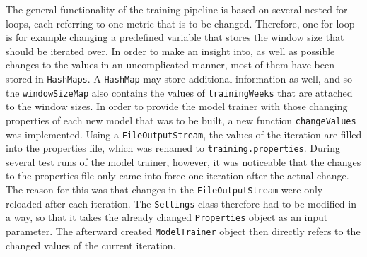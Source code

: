 The general functionality of the training pipeline is based on several nested for-loops, each referring to one metric that is to be changed. Therefore, one for-loop is for example changing a predefined variable that stores the window size that should be iterated over. In order to make an insight into, as well as possible changes to the values in an uncomplicated manner, most of them have been stored in \texttt{HashMaps}. A \texttt{HashMap} may store additional information as well, and so the \texttt{windowSizeMap} also contains the values of \texttt{trainingWeeks} that are attached to the window sizes. In order to provide the model trainer with those changing properties of each new model that was to be built, a new function \texttt{changeValues} was implemented. Using a \texttt{FileOutputStream}, the values of the iteration are filled into the properties file, which was renamed to \texttt{training.properties}. During several test runs of the model trainer, however, it was noticeable that the changes to the properties file only came into force one iteration after the actual change. The reason for this was that changes in the \texttt{FileOutputStream} were only reloaded after each iteration. The \texttt{Settings} class therefore had to be modified in a way, so that it takes the already changed \texttt{Properties} object as an input parameter. The afterward created \texttt{ModelTrainer} object then directly refers to the changed values of the current iteration. 

